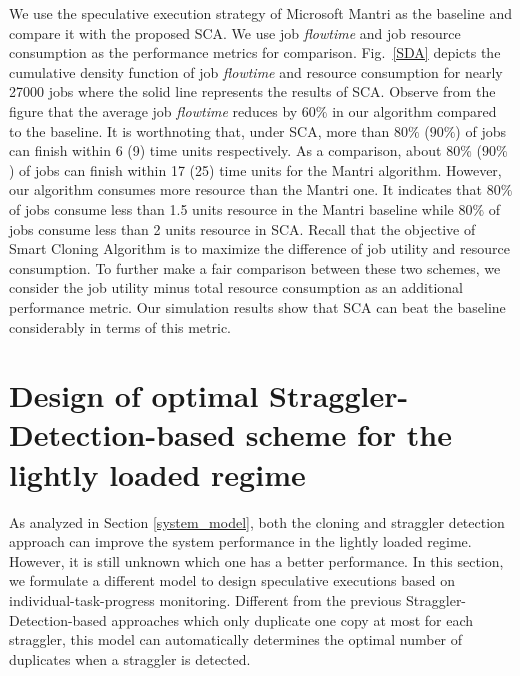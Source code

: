 \documentclass[10pt,conference]{IEEEtran}
\begin{document}
We use the speculative execution strategy of Microsoft Mantri as the baseline and compare it with the proposed SCA. We use job \textit{flowtime} and job resource consumption as the performance metrics for comparison. Fig.~\ref{SDA} depicts the cumulative density function of job \textit{flowtime} and resource consumption for nearly 27000 jobs where the solid line represents the results of SCA.
Observe from the figure that the average job \textit{flowtime} reduces by $60\%$ in our algorithm compared to the baseline. It is worthnoting that, under SCA, more than $80\%$ ($90\%$) of jobs can finish within 6 (9) time units respectively.  As a comparison, about $80\%$  ($90\%$) of jobs can finish within 17 (25) time units  for the Mantri algorithm. However, our algorithm consumes more resource than the Mantri one. It indicates that $80 \%$ of jobs consume less than 1.5 units resource in the Mantri baseline while $80\%$ of jobs consume less than 2 units resource in SCA. Recall that the objective of Smart Cloning Algorithm is to maximize the difference of job utility and resource consumption. To further make a fair comparison between these two schemes, we  consider the job utility minus total resource consumption as an additional performance metric. Our simulation results show that SCA can beat the baseline considerably in terms of this metric.


\section{Design of optimal Straggler-Detection-based scheme for the lightly loaded regime}
\label{SDA_design}
As analyzed in Section \ref{system_model}, both the cloning and straggler detection approach can improve the system performance in the lightly loaded regime. However, it is still unknown which one has a better performance. In this section, we formulate a different model to design speculative executions based on individual-task-progress monitoring. Different from the previous Straggler-Detection-based approaches which only duplicate one copy at most for each straggler, this model can automatically determines the optimal number of duplicates when a straggler is detected.
\end{document}
